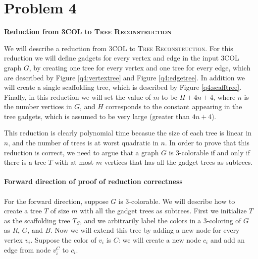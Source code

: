 \newcommand{\tr}{\textsc{Tree Reconstruction}\xspace}
\newcommand{\tc}{\textsc{3COL}\xspace}

\section*{Problem 4}

{\bf Reduction from \tc to \tr}

We will describe a reduction from \tc to \tr. For this reduction we
will define gadgets for every vertex and edge in the input \tc graph
$G$, by creating one tree for every vertex and one tree for every
edge, which are described by Figure \ref{q4:vertextree}
and Figure \ref{q4:edgetree}.
In addition we will create a single scaffolding tree, which is
described by Figure \ref{q4:scafftree}. Finally, in this
reduction we will set the value of $m$ to be $H + 4n + 4$,
where $n$ is the number vertices in $G$, and $H$ corresponds
to the constant appearing in the tree gadgets, which is assumed
to be very large (greater than $4n + 4$).

This reduction is clearly polynomial time becasue the size of
each tree is linear in $n$, and the number of trees is at worst
quadratic in $n$. In order to prove that this reduction is correct,
we need to argue that a graph $G$ is 3-colorable if and only if there
is a tree $T$ with at most $m$ vertices that has all the gadget trees
as subtrees.\\ 
\\
{\bf Forward direction of proof of reduction correctness}\\
\\
For the forward direction, suppose $G$ is 3-colorable. We will
describe how to create a tree $T$ of size $m$ with all the gadget
trees as subtrees. First we initialize $T$ as the scaffolding
tree $T_S$, and we arbitrarily label the colors in a 3-coloring
of $G$ as $R$, $G$, and $B$. Now we will extend this tree
by adding a new node for every vertex $v_i$. Suppose the color
of $v_i$ is $C$: we will create a new node $c_i$ and
add an edge from node $v_i^C$ to $c_i$.

